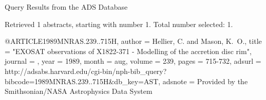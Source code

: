 Query Results from the ADS Database


Retrieved 1 abstracts, starting with number 1.  Total number selected: 1.

@ARTICLE{1989MNRAS.239..715H,
   author = {{Hellier}, C. and {Mason}, K.~O.},
    title = "{EXOSAT observations of X1822-371 - Modelling of the accretion disc rim}",
  journal = {\mnras},
     year = 1989,
    month = aug,
   volume = 239,
    pages = {715-732},
   adsurl = {http://adsabs.harvard.edu/cgi-bin/nph-bib_query?bibcode=1989MNRAS.239..715H&db_key=AST},
  adsnote = {Provided by the Smithsonian/NASA Astrophysics Data System}
}


